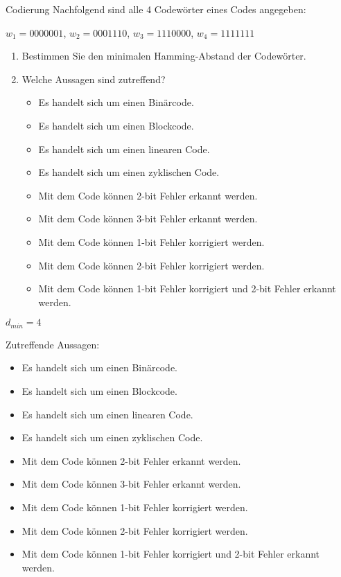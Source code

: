 \documentclass{exercisesheet}
\begin{document}
  \begin{exercise*}{Codierung}
    Nachfolgend sind alle 4 Codewörter eines Codes angegeben:
    \begin{center} $w_1 = 0000001$, $w_2 = 0001110$, $w_3 = 1110000$, $w_4 = 1111111$ \end{center}
    \begin{enumerate}
      \item Bestimmen Sie den minimalen Hamming-Abstand der Codewörter.
      \item Welche Aussagen sind zutreffend?
        \begin{itemize}
          \item Es handelt sich um einen Binärcode.
          \item Es handelt sich um einen Blockcode.
          \item Es handelt sich um einen linearen Code.
          \item Es handelt sich um einen zyklischen Code.
          \item Mit dem Code können 2-bit Fehler erkannt werden.
          \item Mit dem Code können 3-bit Fehler erkannt werden.
          \item Mit dem Code können 1-bit Fehler korrigiert werden.
          \item Mit dem Code können 2-bit Fehler korrigiert werden.
          \item Mit dem Code können 1-bit Fehler korrigiert und 2-bit Fehler erkannt werden.
        \end{itemize}
    \end{enumerate}
  \end{exercise*}

  \begin{solution}
    \item $d_{min} = 4$
    \item Zutreffende Aussagen:
      \begin{itemize}
        \item Es handelt sich um einen Binärcode. \checkmark
        \item Es handelt sich um einen Blockcode. \checkmark
        \item Es handelt sich um einen linearen Code. \checkmark
        \item Es handelt sich um einen zyklischen Code. \checkmark
        \item Mit dem Code können 2-bit Fehler erkannt werden. \checkmark
        \item Mit dem Code können 3-bit Fehler erkannt werden. \checkmark
        \item Mit dem Code können 1-bit Fehler korrigiert werden. \checkmark
        \item Mit dem Code können 2-bit Fehler korrigiert werden. \xmark
        \item Mit dem Code können 1-bit Fehler korrigiert und 2-bit Fehler erkannt werden. \checkmark
      \end{itemize}
  \end{solution}
\end{document}
